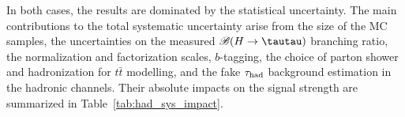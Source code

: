 \documentclass[PAPER, coverpage, atlasdraft=true, texlive=2016, UKenglish]{\ATLASLATEXPATH atlasdoc} %
\begin{document}
In both cases, the results are dominated by the statistical uncertainty.
The main contributions to the total systematic uncertainty arise from  the size of the MC samples,
the uncertainties on the measured $\BR(H\to \tautau)$ branching ratio,
the normalization and factorization scales, $b$-tagging, the choice of parton shower and hadronization for $t\bar t$ modelling, and
the fake $\tau_{\mathrm{had}}$ background estimation in the hadronic channels. Their absolute impacts on the signal strength are summarized in Table~\ref{tab:had_sys_impact}.
\end{document}
